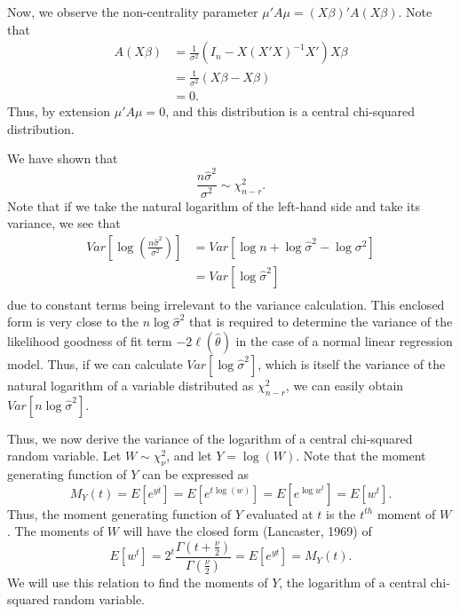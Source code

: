 \documentclass[12pt]{article} %
\theoremstyle{definition}
\begin{document}
Now, we observe the non-centrality parameter $\mu 'A \mu = (X \beta)'A(X \beta)$. Note that
\begin{equation*}
	\begin{split}
	A(X \beta) & = \frac{1}{\sigma^2} (I_n - X (X' X)^{-1} X')X\beta  \\ 
	& = \frac{1}{\sigma^2} (X \beta - X \beta) \\
	& = 0 .
	\end{split}
\end{equation*}
Thus, by extension $\mu 'A \mu = 0$, and this distribution is a central chi-squared distribution.

We have shown that
\begin{equation}
	\frac{n \hat{\sigma}^2}{\sigma^2} \sim \chi^2_{n-r} .
\end{equation}
Note that if we take the natural logarithm of the left-hand side and take its variance, we see that
\begin{equation}
	\begin{split}
		Var \left[ \log(\frac{n \hat{\sigma}^2}{\sigma^2}) \right] & = Var \left[ \log n + \log \hat{\sigma}^2 - \log \sigma^2 \right]  \\ 
		& = Var \left[ \log \hat{\sigma}^2 \right] \\
	\end{split}
\end{equation}
due to constant terms being irrelevant to the variance calculation. This enclosed form is very close to the $n \log \hat{\sigma}^2$ that is required
to determine the variance of the likelihood goodness of fit term $-2 \ell (\hat{\theta} )$ in the case of a normal linear regression model.
Thus, if we can calculate $Var \left[ \log \hat{\sigma}^2 \right]$, which is itself the variance
of the natural logarithm of a variable distributed as $\chi^2_{n-r}$, we can easily obtain $Var \left[ n \log \hat{\sigma}^2 \right]$.

Thus, we now derive the variance of the logarithm of a central chi-squared random variable. Let $W \sim \chi^2_{\nu}$, and let $Y = \log(W)$. Note that
the moment generating function of $Y$ can be expressed as
\begin{equation*}
	M_Y (t) = E \left[ e^{yt} \right] = E \left[ e^{t\log(w)} \right] = E \left[ e^{\log w^t} \right] = E \left[ w^t \right] .
\end{equation*}
Thus, the moment generating function of $Y$ evaluated at $t$ is the $t^{th}$ moment of $W$. The moments of $W$ will have the
closed form (Lancaster, 1969) of
\begin{equation*}
	E \left[ w^t \right] = 2^t \frac{\Gamma (t + \frac{\nu}{2})}{\Gamma (\frac{\nu}{2})} = E \left[ e^{yt} \right] = M_Y (t) .
\end{equation*}
We will use this relation to find the moments of $Y$, the logarithm of a central chi-squared random variable.
\end{document}
